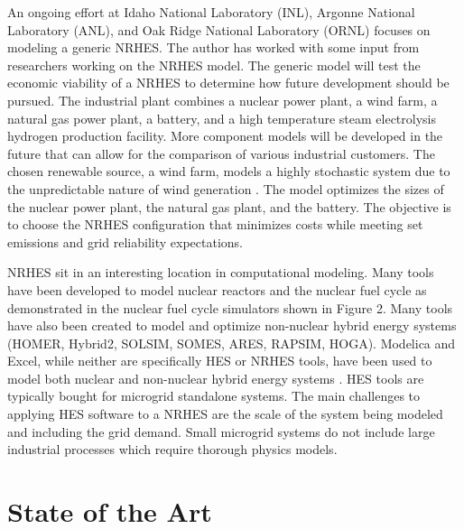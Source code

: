 \documentclass{article}                                                                           %
\begin{document}
\begin{linenumbers}
An ongoing effort at Idaho National Laboratory (INL), Argonne National Laboratory (ANL), and Oak Ridge National Laboratory (ORNL) focuses on modeling a generic NRHES. The author has worked with some input from researchers working on the NRHES model. The generic model will test the economic viability of a NRHES to determine how future development should be pursued. The industrial plant combines a nuclear power plant, a wind farm, a natural gas power plant, a battery, and a high temperature steam electrolysis hydrogen production facility. More component models will be developed in the future that can allow for the comparison of various industrial customers\cite{Harrison2016}. The chosen renewable source, a wind farm, models a highly stochastic system due to the unpredictable nature of wind generation \cite{Chen2016_wind}. The model optimizes the sizes of the nuclear power plant, the natural gas plant, and the battery. The objective is to choose the NRHES configuration that minimizes costs while meeting set emissions and grid reliability expectations.

NRHES sit in an interesting location in computational modeling. Many tools have been developed to model nuclear reactors and the nuclear fuel cycle as demonstrated in the nuclear fuel cycle simulators shown in Figure 2. Many tools have also been created to model and optimize non-nuclear hybrid energy systems (HOMER, Hybrid2, SOLSIM, SOMES, ARES, RAPSIM, HOGA)\cite {Bernal-Agustin2009}. Modelica and Excel, while neither are specifically HES or NRHES tools, have been used to model both nuclear and non-nuclear hybrid energy systems \cite{Shropshire2012, Chen2016, Binder2014, Garcia2015, Epiney2016}. HES tools are typically bought for microgrid standalone systems. The main challenges to applying HES software to a NRHES are the scale of the system being modeled and including the grid demand. Small microgrid systems do not include large industrial processes which require thorough physics models.

\section{State of the Art}


\end{linenumbers}
\end{document}
